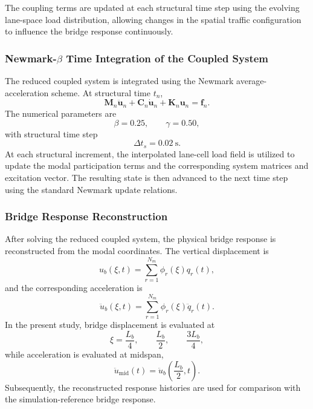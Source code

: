 \documentclass[journal]{IEEEtran}
\begin{document}
The coupling terms are updated at each structural time step using the evolving lane-space load distribution, allowing changes in the spatial traffic configuration to influence the bridge response continuously.

\subsubsection{Newmark-$\beta$ Time Integration of the Coupled System}

The reduced coupled system is integrated using the Newmark average-acceleration scheme. At structural time $t_n$,
\begin{equation}
\mathbf{M}_n\ddot{\mathbf{u}}_n+\mathbf{C}_n\dot{\mathbf{u}}_n+\mathbf{K}_n\mathbf{u}_n=\mathbf{f}_n.
\end{equation}
The numerical parameters are
\begin{equation}
\beta=0.25,\qquad\gamma=0.50,
\end{equation}
with structural time step
\begin{equation}
\Delta t_s=0.02~\mathrm{s}.
\end{equation}
At each structural increment, the interpolated lane-cell load field is utilized to update the modal participation terms and the corresponding system matrices and excitation vector. The resulting state is then advanced to the next time step using the standard Newmark update relations.

\subsubsection{Bridge Response Reconstruction}

After solving the reduced coupled system, the physical bridge response is reconstructed from the modal coordinates. The vertical displacement is
\begin{equation}
u_b(\xi,t)=\sum_{r=1}^{N_m}\phi_r(\xi)q_r(t),
\end{equation}
and the corresponding acceleration is
\begin{equation}
\ddot{u}_b(\xi,t)=\sum_{r=1}^{N_m}\phi_r(\xi)\ddot{q}_r(t).
\end{equation}
In the present study, bridge displacement is evaluated at
\begin{equation}
\xi=\frac{L_b}{4},\qquad\frac{L_b}{2},\qquad\frac{3L_b}{4},
\end{equation}
while acceleration is evaluated at midspan,
\begin{equation}
\ddot{u}_{\mathrm{mid}}(t)=\ddot{u}_b\left(\frac{L_b}{2},t\right).
\end{equation}
Subsequently, the reconstructed response histories are used for comparison with the simulation-reference bridge response.
\end{document}
